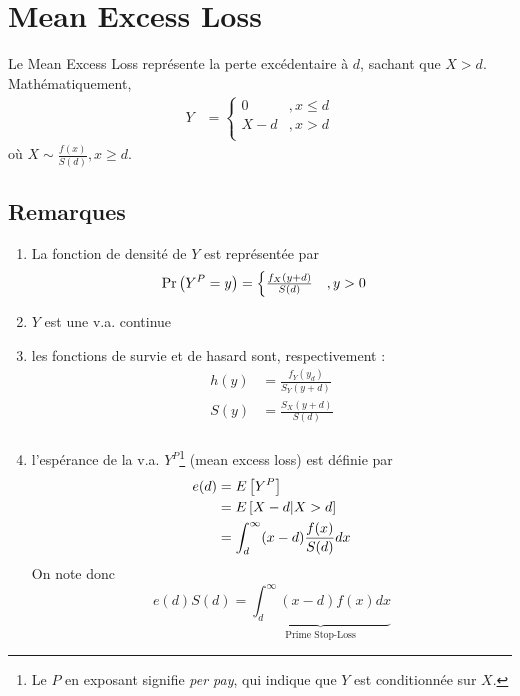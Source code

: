 \documentclass[12pt, french]{report}
\begin{document}
\section{Mean Excess Loss}
Le Mean Excess Loss représente la perte excédentaire à $d$, sachant que $X > d$. Mathématiquement,
\begin{align*}
Y & = 
\begin{cases}
0		& , x \leq d \\
X - d 	& , x > d \\
\end{cases}
\end{align*}
où $X \sim \frac{f(x)}{S(d)}, x \geq d$.

\subsection{Remarques}
\begin{enumerate}[label=(\arabic*)]
\item La fonction de densité de $Y$ est représentée par
\begin{align*}
\Pr \left( Y^P = y \right) & =
\begin{cases}
\frac{f_X(y+d)}{S(d)} &  , y > 0 \\
\end{cases} 
\end{align*}

\item $Y$ est une v.a. continue

\item les fonctions de survie et de hasard sont, respectivement  :
\begin{align*}
h(y)	 	& = \frac{f_Y(y_d)}{S_Y(y+d)} \\
S(y)		& = \frac{S_X(y+d)}{S(d)} \\
\end{align*}

\item l'espérance de la v.a. $Y^P$\footnote{Le $P$ en exposant signifie \textit{per pay}, qui indique que $Y$ est conditionnée sur $X$.} (mean excess loss) est définie par
\begin{align*}
e(d) & = E \left[ Y^P \right] \\
	& =  E \left[ X - d | X > d \right] \\
	& = \int_{d}^{\infty} (x-d) \frac{f(x)}{S(d)} dx \\
\end{align*}
On note donc
\begin{equation}
e(d) S(d)	= \underbrace{\int_{d}^{\infty} (x-d) f(x) dx}_{\text{Prime Stop-Loss}}
\end{equation}
\end{enumerate}
\end{document}
